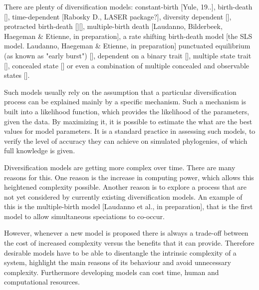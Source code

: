 \documentclass{article}
\begin{document}
There are plenty of diversification models: 
constant-birth [Yule, 19..],
birth-death [\cite{nee1994reconstructed}], 
time-dependent [Rabosky D., LASER package?], 
diversity dependent [\cite{etienne2011diversity}], 
protracted birth-death [\cite{rosindell2010protracted}][\cite{etienne2012prolonging}],
multiple-birth death [Laudanno, Bilderbeek, Haegeman \& Etienne, in preparation],
a rate shifting birth-death model [the SLS model. Laudanno, Haegeman \& Etienne, in preparation]
punctuated equilibrium (as known as "early burst") [\cite{harmon2010early}],
dependent on a binary trait [\cite{maddison2007estimating}], 
multiple state trait [\cite{fitzjohn2012diversitree}],
concealed state [\cite{beaulieu2016detecting}] 
or even a combination of multiple concealed and observable states [\cite{herrera2018detecting}].

Such models usually rely on the assumption 
that a particular diversification process 
can be explained mainly by a specific mechanism.
Such a mechanism is built into a likelihood function, 
which provides the likelihood of the parameters, given the data.
By maximizing it, it is possible 
to estimate the what are the best values for model parameters. 
It is a standard practice in assessing such models,
to verify the level of accuracy they can achieve
on simulated phylogenies, of which full knowledge is given.

Diversification models are getting more complex over time. There are many
reasons for this. One reason is the increase in computing power,
which allows this heightened complexity possible.
Another reason is to explore a process that are not yet considered by currently existing diversification models. An example of this
is the multiple-birth model [Laudanno et al., in preparation], 
that is the first model to allow simultaneous speciations to co-occur.

However, whenever a new model is proposed there is always a trade-off between the cost of increased complexity versus the benefits that it can provide.
Therefore desirable models have to be able to disentangle the intrinsic complexity of a system, 
highlight the main reasons of its behaviour and avoid unnecessary complexity. Furthermore developing models can cost time, human and computational resources.

\end{document}
